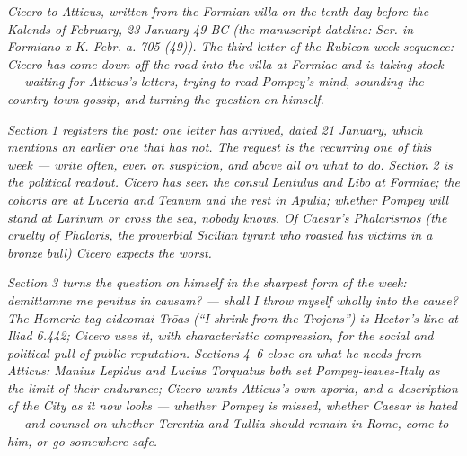 
\textit{Cicero to Atticus, written from the Formian
villa on the tenth day before the Kalends of February,
23 January 49 BC (the manuscript dateline:
\textit{Scr. in Formiano x K. Febr. a. 705 (49)}).
The third letter of the Rubicon-week sequence: Cicero
has come down off the road into the villa at Formiae
and is taking stock --- waiting for Atticus's letters,
trying to read Pompey's mind, sounding the country-town
gossip, and turning the question on himself.}

\textit{Section 1 registers the post: one letter has
arrived, dated 21 January, which mentions an earlier
one that has not. The request is the recurring one of
this week --- write often, even on suspicion, and above
all on what to do. Section 2 is the political readout.
Cicero has seen the consul Lentulus and Libo at Formiae;
the cohorts are at Luceria and Teanum and the rest in
Apulia; whether Pompey will stand at Larinum or cross
the sea, nobody knows. Of Caesar's \emph{Phalarismos}
(the cruelty of Phalaris, the proverbial Sicilian tyrant
who roasted his victims in a bronze bull) Cicero
expects the worst.}

\textit{Section 3 turns the question on himself in the
sharpest form of the week: \emph{demittamne me penitus
in causam?} --- shall I throw myself wholly into the
cause? The Homeric tag \emph{aideomai Trōas} (``I shrink
from the Trojans'') is Hector's line at \emph{Iliad}
6.442; Cicero uses it, with characteristic compression,
for the social and political pull of public reputation.
Sections 4--6 close on what he needs from Atticus:
Manius Lepidus and Lucius Torquatus both set
Pompey-leaves-Italy as the limit of their endurance;
Cicero wants Atticus's own \emph{aporia}, and a
description of the City as it now looks --- whether
Pompey is missed, whether Caesar is hated --- and
counsel on whether Terentia and Tullia should remain
in Rome, come to him, or go somewhere safe.}
